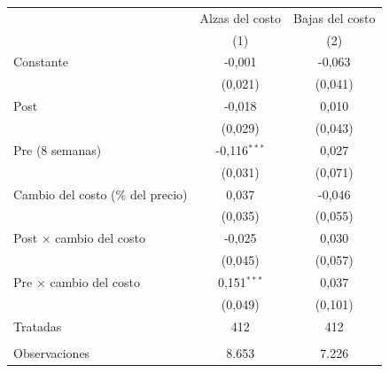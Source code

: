 \begingroup
\centering
\begin{tabular}{lcc}
   \toprule
                                     & Alzas del costo & Bajas del costo \\   
                                     & (1)             & (2)\\  
   \midrule 
   Constante                         & -0{,}001          & -0{,}063\\   
                                     & (0{,}021)         & (0{,}041)\\   
   Post                              & -0{,}018          & 0{,}010\\   
                                     & (0{,}029)         & (0{,}043)\\   
   Pre (8 semanas)                   & -0{,}116$^{***}$  & 0{,}027\\   
                                     & (0{,}031)         & (0{,}071)\\   
   Cambio del costo (\% del precio)  & 0{,}037           & -0{,}046\\   
                                     & (0{,}035)         & (0{,}055)\\   
   Post $\times$ cambio del costo    & -0{,}025          & 0{,}030\\   
                                     & (0{,}045)         & (0{,}057)\\   
   Pre $\times$ cambio del costo     & 0{,}151$^{***}$   & 0{,}037\\   
                                     & (0{,}049)         & (0{,}101)\\   
   Tratadas                          & 412             & 412\\  
    \\
   Observaciones                     & 8.653           & 7.226\\  
   \bottomrule
\end{tabular}
\par\endgroup
